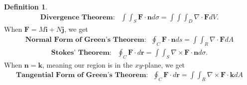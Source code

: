 \documentclass[12pt, letter]{article}
\theoremstyle{plain}
\numberwithin{theorem}{section}
\theoremstyle{definition}
\newtheorem{definition}[theorem]{Definition}
\begin{document}
\bigskip

\hrulefill

\bigskip

\begin{definition}
\\
\begin{align*}
\textbf{Divergence Theorem}: \ \ \ \int\int_S \bm{F}\cdot\bm{n}d\sigma = \int\int\int_D \nabla \cdot \bm{F}dV.
\end{align*}
When $\bm{F} = M\bm{i}+N\bm{j}$, we get
\begin{align*}
\textbf{Normal Form of Green's Theorem:} \ \ \ \oint_C \bm{F}\cdot\bm{n}ds = \int\int_R \nabla \cdot \bm{F}dA
\end{align*}
\hrulefill
\begin{align*}
\textbf{Stokes' Theorem}: \ \ \ \oint_C \bm{F}\cdot d\bm{r} = \int\int_S \nabla \times \bm{F}\cdot \bm{n} d\sigma.
\end{align*}
When $\bm{n}=\bm{k}$, meaning our region is in the $xy$-plane, we get
\begin{align*}
\textbf{Tangential Form of Green's Theorem:} \ \ \ \oint_C \bm{F}\cdot d\bm{r} = \int\int_R \nabla \times \bm{F}\cdot\bm{k} dA
\end{align*}
\end{definition}
\end{document}
